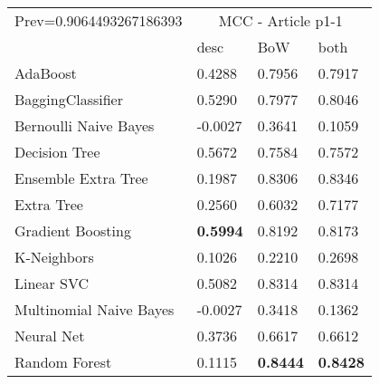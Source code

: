 \begin{tabular}{|l|l|l|l| }
\hline
Prev=0.9064493267186393 &  \multicolumn{3}{c|}{MCC - Article p1-1} \\
\cline{2-4} & desc & BoW & both \\ \hline
AdaBoost                & 0.4288 & 0.7956 & 0.7917\\
BaggingClassifier       & 0.5290 & 0.7977 & 0.8046\\
Bernoulli Naive Bayes   & -0.0027 & 0.3641 & 0.1059\\
Decision Tree           & 0.5672 & 0.7584 & 0.7572\\
Ensemble Extra Tree     & 0.1987 & 0.8306 & 0.8346\\
Extra Tree              & 0.2560 & 0.6032 & 0.7177\\
Gradient Boosting       & {\bf 0.5994} & 0.8192 & 0.8173\\
K-Neighbors             & 0.1026 & 0.2210 & 0.2698\\
Linear SVC              & 0.5082 & 0.8314 & 0.8314\\
Multinomial Naive Bayes & -0.0027 & 0.3418 & 0.1362\\
Neural Net              & 0.3736 & 0.6617 & 0.6612\\
Random Forest           & 0.1115 & {\bf 0.8444} & {\bf 0.8428}\\
\hline
\end{tabular}